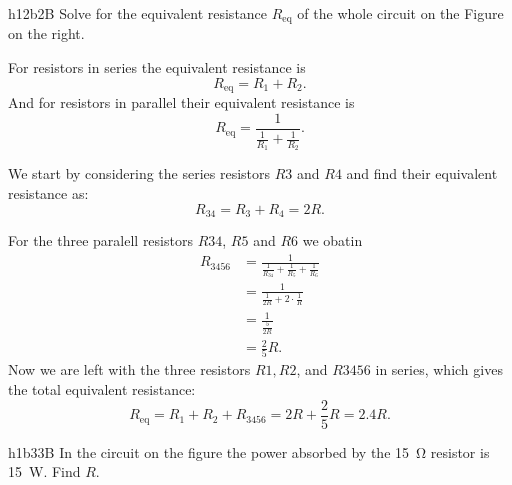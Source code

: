 
  \begin{problemwithimage}{h12b}{2B}
    Solve for the equivalent resistance $R_{\mathrm{eq}}$ of the whole circuit on the Figure on the right.
  \end{problemwithimage}
  
  \begin{derivation}
    For resistors in series the equivalent resistance is
    \begin{equation*}
      R_{\mathrm{eq}} = R_1 + R_2
    .\end{equation*}
    And for resistors in parallel their equivalent resistance is
    \begin{equation*}
      R_{\mathrm{eq}} = \frac{1}{\frac{1}{R_1} + \frac{1}{R_2}}
    .\end{equation*}
    
    We start by considering the series resistors $R3$ and $R4$ and find their equivalent resistance as:
    \begin{equation*}
      R_{34} = R_3 + R_4 = 2R
    .\end{equation*}

    For the three paralell resistors $R34$, $R5$ and $R6$ we obatin
    \begin{align*}
      R_{3456} &= \frac{1}{\frac{1}{R_{34}} + \frac{1}{R_{5}} + \frac{1}{R_6}} \\
               &= \frac{1}{\frac{1}{2R} + 2 \cdot \frac{1}{R}} \\
               &= \frac{1}{\frac{5}{2R}} \\
               &= \frac{2}{5} R
    .\end{align*}
    Now we are left with the three resistors $R1, R2$, and $R3456$ in series, which gives the total equivalent resistance:
    \begin{equation*}
      R_{\mathrm{eq}} = R_1 + R_2 + R_{3456} = 2R + \frac{2}{5} R = \num{2,4} R
    .\end{equation*}
  \end{derivation}

  

  \begin{problemwithimage}{h1b3}{3B}
    In the circuit on the figure the power absorbed by the \qty{15}{\ohm} resistor is \qty{15}{\W}. Find $R$.
  \end{problemwithimage}

